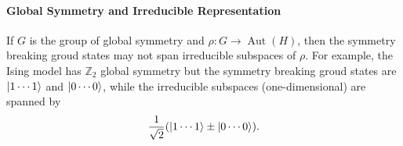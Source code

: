\documentclass{article}
\begin{document}
\paragraph*{Global Symmetry and Irreducible Representation}%
If $G$ is the group of global symmetry and $\rho:G\rightarrow \operatorname{Aut}(H)$, then the symmetry breaking groud states may not span irreducible subspaces of $\rho$.
For example, the Ising model has $\mathbb{Z}_2$ global symmetry but the symmetry breaking groud states are $\ket{1\cdots 1}$ and $\ket{0\cdots 0}$, while the irreducible subspaces (one-dimensional) are spanned by
\[ \frac{1}{\sqrt{2}}(\ket{1\cdots 1} \pm \ket{0\cdots 0}). \]

% 
% 
\end{document}
